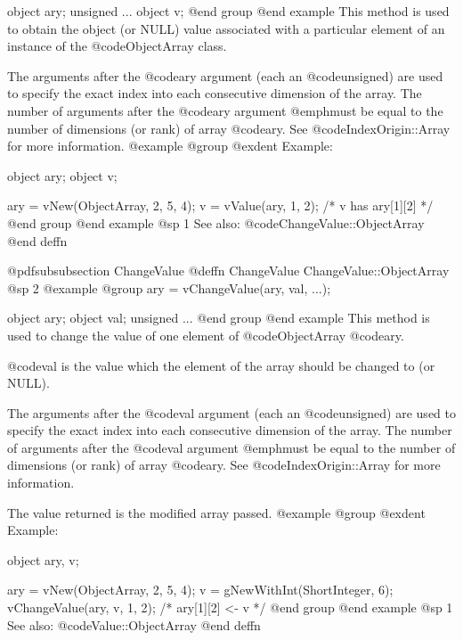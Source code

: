 object    ary;
unsigned  ...
object    v;
@end group
@end example
This method is used to obtain the object (or NULL) value associated with a
particular element of an instance of the @code{ObjectArray} class.

The arguments after the @code{ary} argument (each an @code{unsigned})
are used to specify the exact index into each consecutive dimension of
the array.  The number of arguments after the @code{ary} argument
@emph{must} be equal to the number of dimensions (or rank) of array
@code{ary}.  See @code{IndexOrigin::Array} for more information.
@example
@group
@exdent Example:

object  ary;
object  v;

ary = vNew(ObjectArray, 2, 5, 4);
v = vValue(ary, 1, 2);
/*  v has ary[1][2]  */
@end group
@end example
@sp 1
See also:  @code{ChangeValue::ObjectArray}
@end deffn








@pdfsubsubsection {ChangeValue}
@deffn {ChangeValue} ChangeValue::ObjectArray
@sp 2
@example
@group
ary = vChangeValue(ary, val, ...);

object    ary;
object    val;
unsigned  ...
@end group
@end example
This method is used to change the value of one element of
@code{ObjectArray} @code{ary}.

@code{val} is the value which the element of the array should be changed
to (or NULL).

The arguments after the @code{val} argument (each an @code{unsigned})
are used to specify the exact index into each consecutive dimension of
the array.  The number of arguments after the @code{val} argument
@emph{must} be equal to the number of dimensions (or rank) of array
@code{ary}.  See @code{IndexOrigin::Array} for more information.

The value returned is the modified array passed.
@example
@group
@exdent Example:

object  ary, v;

ary = vNew(ObjectArray, 2, 5, 4);
v = gNewWithInt(ShortInteger, 6);
vChangeValue(ary, v, 1, 2);
/*  ary[1][2] <- v  */
@end group
@end example
@sp 1
See also:  @code{Value::ObjectArray}
@end deffn









